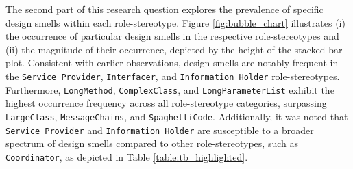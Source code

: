 \documentclass[AMA,Times1COL]{WileyNJDv5} %
\begin{document}
	The second part of this research question explores the prevalence of specific design smells within each role-stereotype. Figure \ref{fig:bubble_chart} illustrates (i) the occurrence of particular design smells in the respective role-stereotypes and (ii) the magnitude of their occurrence, depicted by the height of the stacked bar plot. Consistent with earlier observations, design smells are notably frequent in the {\tt Service Provider}, {\tt Interfacer}, and {\tt Information Holder} role-stereotypes. Furthermore, {\tt LongMethod}, {\tt ComplexClass}, and {\tt LongParameterList} exhibit the highest occurrence frequency across all role-stereotype categories, surpassing {\tt LargeClass}, {\tt MessageChains}, and {\tt SpaghettiCode}. Additionally, it was noted that {\tt Service Provider} and {\tt Information Holder} are susceptible to a broader spectrum of design smells compared to other role-stereotypes, such as {\tt Coordinator}, as depicted in Table \ref{table:tb_highlighted}.
\end{document}

